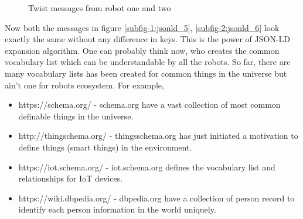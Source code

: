 	
		\begin{figure}[!htbp]
		\hfill
		\caption{Twist messages from robot one and two}
		\label{fig:dummy}
	\end{figure}
	Now both the messages in figure \ref{subfig-1:jsonld_5}, \ref{subfig-2:jsonld_6} look exactly the same without any difference in keys. This is the power of JSON-LD expansion algorithm. One can probably think now, who creates the common vocabulary list which can be understandable by all the robots. So far, there are many vocabulary lists has been created for common things in the universe but ain't one for robots ecosystem. For example,
	
	
	\begin{itemize}
		\item https://schema.org/ - schema.org have a vast collection of most common definable things in the universe.
		\item http://thingschema.org/ - thingsschema.org has just initiated a motivation to define things (smart things) in the environment.
		\item https://iot.schema.org/ - iot.schema.org defines the vocabulary list and relationships for IoT devices.
		\item https://wiki.dbpedia.org/ - dbpedia.org have a collection of person record to identify each person information in the world uniquely.
	\end{itemize}

